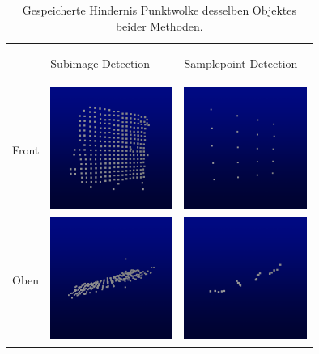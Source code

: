 \begin{table}[h]
\centering
\begin{tabular}{m{2cm} m{4cm} m{4cm}}
    & \begin{center} {\scriptsize Subimage Detection} \end{center}
    & \begin{center} {\scriptsize Samplepoint Detection} \end{center}\\
	{ \scriptsize Front}
	& \includegraphics[width=4cm]{img/pointclouds/pcl_sample_front}
	& \includegraphics[width=4cm]{img/pointclouds/pcl_sub_front}\\
	{ \scriptsize Oben}
	& \includegraphics[width=4cm]{img/pointclouds/pcl_sample_top}
	& \includegraphics[width=4cm]{img/pointclouds/pcl_sub_top}
\end{tabular}
\caption{Gespeicherte Hindernis Punktwolke desselben Objektes beider Methoden.}
\label{fig:obstacle_pointclouds}
\end{table}


